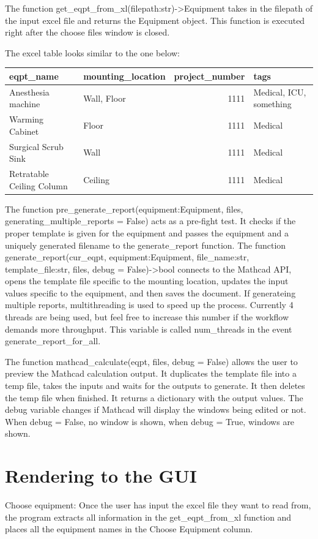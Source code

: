 \documentclass[11pt]{article}
\begin{document}
The function get\_eqpt\_from\_xl(filepath:str)->Equipment takes in the filepath of the input excel file and returns the Equipment object. This function is executed right after the choose files window is closed.

The excel table looks similar to the one below:
\begin{center}
\begin{tabular}{llrl}
\hline
eqpt\_name & mounting\_location & project\_number & tags\\
\hline
Anesthesia machine & Wall, Floor & 1111 & Medical, ICU, something\\
Warming Cabinet & Floor & 1111 & Medical\\
Surgical Scrub Sink & Wall & 1111 & Medical\\
Retratable Ceiling Column & Ceiling & 1111 & Medical\\
\hline
\end{tabular}
\end{center}

The function pre\_generate\_report(equipment:Equipment, files, generating\_multiple\_reports = False) acts as a pre-fight test. It checks if the proper template is given for the equipment and passes the equipment and a uniquely generated filename to the generate\_report function. The function generate\_report(cur\_eqpt, equipment:Equipment, file\_name:str, template\_file:str, files, debug = False)->bool connects to the Mathcad API, opens the template file specific to the mounting location, updates the input values specific to the equipment, and then saves the document. If generateing multiple reports, multithreading is used to speed up the process. Currently 4 threads are being used, but feel free to increase this number if the workflow demands more throughput. This variable is called num\_threads in the event generate\_report\_for\_all.

The function mathcad\_calculate(eqpt, files, debug = False) allows the user to preview the Mathcad calculation output. It duplicates the template file into a temp file, takes the inputs and waits for the outputs to generate. It then deletes the temp file when finished. It returns a dictionary with the output values. The debug variable changes if Mathcad will display the windows being edited or not. When debug = False, no window is shown, when debug = True, windows are shown.

\section{Rendering to the GUI}
\label{sec:orged1876b}
Choose equipment: Once the user has input the excel file they want to read from, the program extracts all information in the get\_eqpt\_from\_xl function and places all the equipment names in the Choose Equipment column.
\end{document}
